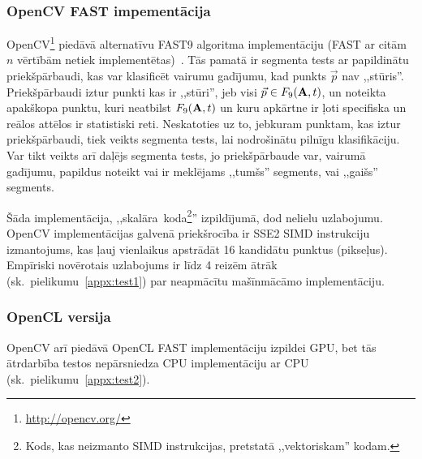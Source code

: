 \subsubsection{OpenCV FAST impementācija} \label{sec:fast-ocv}
OpenCV\footnote{\url{http://opencv.org/}} piedāvā alternatīvu FAST9 algoritma
implementāciju (FAST ar citām $n$ vērtībām netiek implementētas)~\cite{OpenCV-src}.
Tās pamatā ir segmenta tests ar papildinātu
priekšpārbaudi\cite{Rosten-tracking}\cite{FAST}, kas var klasificēt vairumu
gadījumu, kad punkts $\vec{p}$ nav ,,stūris''. Priekšpārbaudi iztur
punkti kas ir ,,stūri'', jeb visi $\vec{p} \in F_9(\mathbf{A}, t)$,
un noteikta apakškopa punktu, kuri neatbilst $F_9(\mathbf{A}, t)$ un kuru
apkārtne ir ļoti specifiska un reālos attēlos ir statistiski reti.
Neskatoties
uz to, jebkuram punktam, kas iztur priekšpārbaudi, tiek veikts segmenta
tests, lai nodrošinātu pilnīgu klasifikāciju.
Var tikt veikts arī daļējs segmenta tests, jo priekšpārbaude var,
vairumā gadījumu, papildus noteikt vai ir meklējams ,,tumšs'' segments, vai
,,gaišs'' segments.

Šāda implementācija, ,,skalāra~koda\footnote{Kods, kas neizmanto SIMD
	instrukcijas, pretstatā ,,vektoriskam'' kodam.}''
izpildījumā, dod nelielu uzlabojumu. OpenCV implementācijas galvenā
priekšrocība ir SSE2 SIMD instrukciju izmantojums, kas ļauj vienlaikus
apstrādāt 16 kandidātu punktus (pikseļus). Empīriski novērotais
uzlabojums ir līdz 4 reizēm ātrāk (sk.~pielikumu~\ref{appx:test1})
par neapmācītu mašīnmācāmo implementāciju.

\subsubsection*{OpenCL versija}
OpenCV arī piedāvā OpenCL FAST implementāciju izpildei GPU, bet tās
ātrdarbība testos nepārsniedza CPU implementāciju ar CPU
(sk.~pielikumu~\ref{appx:test2}).

\TODO
